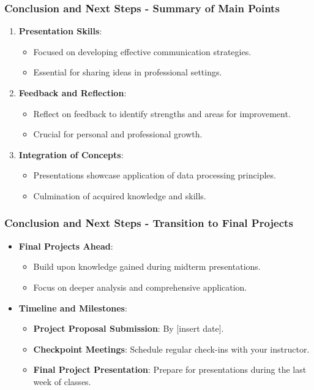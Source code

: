 \documentclass[aspectratio=169]{beamer}
\begin{document}
\begin{frame}[fragile]
    \frametitle{Conclusion and Next Steps - Summary of Main Points}
    \begin{enumerate}
        \item \textbf{Presentation Skills}:
        \begin{itemize}
            \item Focused on developing effective communication strategies.
            \item Essential for sharing ideas in professional settings.
        \end{itemize}
        
        \item \textbf{Feedback and Reflection}:
        \begin{itemize}
            \item Reflect on feedback to identify strengths and areas for improvement.
            \item Crucial for personal and professional growth.
        \end{itemize}
        
        \item \textbf{Integration of Concepts}:
        \begin{itemize}
            \item Presentations showcase application of data processing principles.
            \item Culmination of acquired knowledge and skills.
        \end{itemize}
    \end{enumerate}
\end{frame}

\begin{frame}[fragile]
    \frametitle{Conclusion and Next Steps - Transition to Final Projects}
    \begin{itemize}
        \item \textbf{Final Projects Ahead}:
        \begin{itemize}
            \item Build upon knowledge gained during midterm presentations.
            \item Focus on deeper analysis and comprehensive application.
        \end{itemize}

        \item \textbf{Timeline and Milestones}:
        \begin{itemize}
            \item \textbf{Project Proposal Submission}: By [insert date].
            \item \textbf{Checkpoint Meetings}: Schedule regular check-ins with your instructor.
            \item \textbf{Final Project Presentation}: Prepare for presentations during the last week of classes.
        \end{itemize}
    \end{itemize}
\end{frame}
\end{document}
